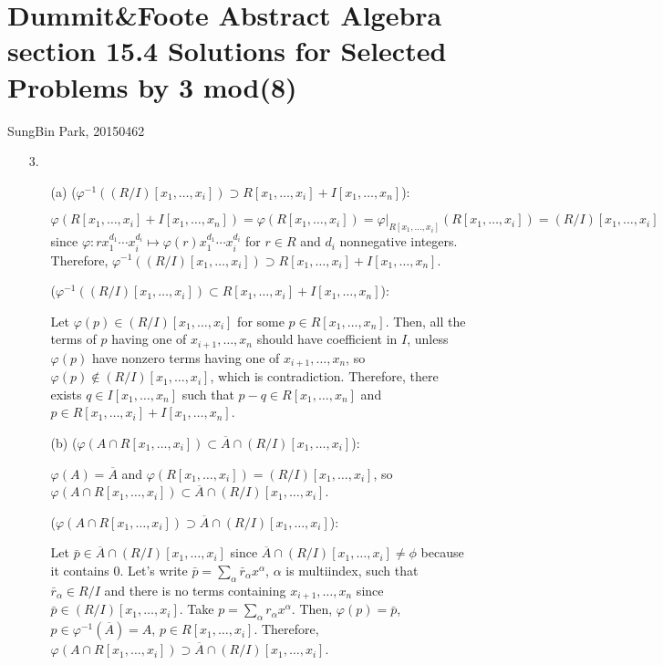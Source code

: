 \documentclass[12pt]{article}
\begin{document}
\section*{Dummit\&Foote Abstract Algebra section 15.4 Solutions for Selected Problems by 3 mod(8)}
SungBin Park, 20150462
\begin{enumerate}
\item[3.]\begin{enumerate}
\item[(a)]($\varphi^{-1}\left((R/I)[x_1, \ldots, x_i]\right)\supset R[x_1,\ldots, x_i]+I[x_1,\ldots, x_n]$): 

$\varphi(R[x_1,\ldots, x_i]+I[x_1,\ldots, x_n])=\varphi(R[x_1,\ldots, x_i])=\varphi|_{R[x_1, \ldots, x_i]}(R[x_1,\ldots, x_i])=(R/I)[x_1, \ldots, x_i]$ since $\varphi:rx_1^{d_1}\cdots x_i^{d_i}\mapsto \varphi(r)x_1^{d_1}\cdots x_i^{d_i}$ for $r\in R$ and $d_i$ nonnegative integers. Therefore, $\varphi^{-1}((R/I)[x_1, \ldots, x_i])\supset R[x_1,\ldots, x_i]+I[x_1,\ldots, x_n]$.

($\varphi^{-1}\left((R/I)[x_1, \ldots, x_i]\right)\subset R[x_1,\ldots, x_i]+I[x_1,\ldots, x_n]$): 

Let $\varphi(p)\in (R/I)[x_1, \ldots, x_i]$ for some $p\in R[x_1, \ldots, x_n]$. Then, all the terms of $p$ having one of $x_{i+1}, \ldots, x_n$ should have coefficient in $I$, unless $\varphi(p)$ have nonzero terms having one of $x_{i+1}, \ldots, x_n$, so $\varphi(p)\notin (R/I)[x_1, \ldots, x_i]$, which is contradiction. Therefore, there exists $q\in I[x_1, \ldots, x_n]$ such that $p-q\in R[x_1, \ldots, x_n]$ and $p\in R[x_1,\ldots, x_i]+I[x_1,\ldots, x_n]$.
\item[(b)] ($\varphi(A\cap R[x_1, \ldots, x_i])\subset \overline{A}\cap (R/I)[x_1, \ldots, x_i]$):

$\varphi(A)=\overline{A}$ and $\varphi(R[x_1,\ldots, x_i])=(R/I)[x_1, \ldots, x_i]$, so $\varphi(A\cap R[x_1, \ldots, x_i])\subset \overline{A}\cap (R/I)[x_1, \ldots, x_i]$.

($\varphi(A\cap R[x_1, \ldots, x_i])\supset \overline{A}\cap (R/I)[x_1, \ldots, x_i]$):

Let $\bar{p}\in \overline{A}\cap (R/I)[x_1, \ldots, x_i]$ since $\overline{A}\cap (R/I)[x_1, \ldots, x_i]\neq \phi$ because it contains $0$. Let's write $\bar{p}=\sum\limits_{\alpha} \bar{r}_\alpha x^\alpha$, $\alpha$ is multiindex, such that $\bar{r}_\alpha\in R/I$ and there is no terms containing $x_{i+1}, \ldots, x_n$ since $\bar{p}\in (R/I)[x_1, \ldots, x_i]$. Take $p=\sum\limits_{\alpha} r_\alpha x^\alpha$. Then, $\varphi(p)=\bar{p}$, $p\in \varphi^{-1}(\overline{A})=A$, $p\in R[x_1, \ldots, x_i]$. Therefore, $\varphi(A\cap R[x_1, \ldots, x_i])\supset \overline{A}\cap (R/I)[x_1, \ldots, x_i]$.
\end{enumerate}


\end{enumerate}
\end{document}
